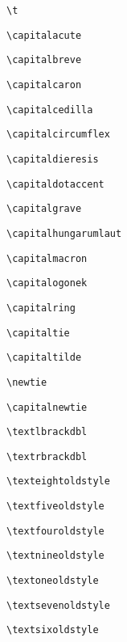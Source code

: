 \documentclass{scrartcl}
\begin{document}
\wrapglyph{\t{\testglyph}} \verb+\t+\par
\wrapglyph{\capitalacute{\testglyph}} \verb+\capitalacute+\par
\wrapglyph{\capitalbreve{\testglyph}} \verb+\capitalbreve+\par
\wrapglyph{\capitalcaron{\testglyph}} \verb+\capitalcaron+\par
\wrapglyph{\capitalcedilla{\testglyph}} \verb+\capitalcedilla+\par
\wrapglyph{\capitalcircumflex{\testglyph}} \verb+\capitalcircumflex+\par
\wrapglyph{\capitaldieresis{\testglyph}} \verb+\capitaldieresis+\par
\wrapglyph{\capitaldotaccent{\testglyph}} \verb+\capitaldotaccent+\par
\wrapglyph{\capitalgrave{\testglyph}} \verb+\capitalgrave+\par
\wrapglyph{\capitalhungarumlaut{\testglyph}} \verb+\capitalhungarumlaut+\par
\wrapglyph{\capitalmacron{\testglyph}} \verb+\capitalmacron+\par
\wrapglyph{\capitalogonek{\testglyph}} \verb+\capitalogonek+\par
\wrapglyph{\capitalring{\testglyph}} \verb+\capitalring+\par
\wrapglyph{\capitaltie{\testglyph}} \verb+\capitaltie+\par
\wrapglyph{\capitaltilde{\testglyph}} \verb+\capitaltilde+\par
\wrapglyph{\newtie{\testglyph}} \verb+\newtie+\par
\wrapglyph{\capitalnewtie{\testglyph}} \verb+\capitalnewtie+\par
\wrapglyph{\textlbrackdbl} \verb+\textlbrackdbl+\par
\wrapglyph{\textrbrackdbl} \verb+\textrbrackdbl+\par
\wrapglyph{\texteightoldstyle} \verb+\texteightoldstyle+\par
\wrapglyph{\textfiveoldstyle} \verb+\textfiveoldstyle+\par
\wrapglyph{\textfouroldstyle} \verb+\textfouroldstyle+\par
\wrapglyph{\textnineoldstyle} \verb+\textnineoldstyle+\par
\wrapglyph{\textoneoldstyle} \verb+\textoneoldstyle+\par
\wrapglyph{\textsevenoldstyle} \verb+\textsevenoldstyle+\par
\wrapglyph{\textsixoldstyle} \verb+\textsixoldstyle+\par
\end{document}
